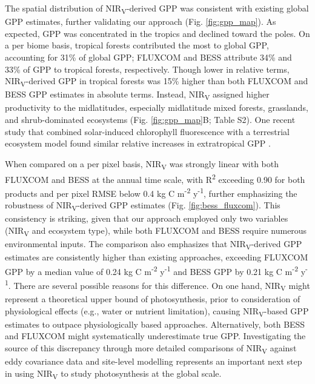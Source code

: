 \documentclass[10pt,letterpaper]{article}
\begin{document}
The spatial distribution of NIR\textsubscript{V}-derived GPP was consistent with existing global GPP estimates, further validating our approach  (Fig. \ref{fig:gpp_map}). As expected, GPP was concentrated in the tropics and declined toward the poles. On a per biome basis, tropical forests contributed the most to global GPP, accounting for 31\%  of global GPP; FLUXCOM and BESS attribute 34\% and 33\% of GPP to tropical forests, respectively. Though lower in relative terms, NIR\textsubscript{V}-derived GPP in tropical forests was 15\% higher than both FLUXCOM and BESS GPP estimates in absolute terms.  Instead, NIR\textsubscript{V} assigned higher productivity to the midlatitudes, especially  midlatitude mixed forests, grasslands, and shrub-dominated ecosystems (Fig. \ref{fig:gpp_map}B; Table S2). One recent study that combined solar-induced chlorophyll fluorescence with a terrestrial ecosystem model found similar relative increases in extratropical GPP \cite{Norton2018}.

When compared on a per pixel basis, NIR\textsubscript{V} was strongly linear with both FLUXCOM and BESS at the annual time scale, with R\textsuperscript{2} exceeding 0.90 for both products and per pixel RMSE below 0.4 kg C m\textsuperscript{-2} y\textsuperscript{-1}, further emphasizing the robustness of NIR\textsubscript{V}-derived GPP estimates (Fig. \ref{fig:bess_fluxcom}). This consistency is striking, given that our approach employed only two variables (NIR\textsubscript{V} and ecosystem type), while both FLUXCOM and BESS require numerous environmental inputs. The comparison also emphasizes that NIR\textsubscript{V}-derived GPP estimates are consistently higher than existing approaches, exceeding FLUXCOM GPP by a median value of 0.24 kg C m\textsuperscript{-2} y\textsuperscript{-1} and BESS GPP by 0.21 kg C m\textsuperscript{-2} y\textsuperscript{-1}. There are several possible reasons for this difference. On one hand, NIR\textsubscript{V} might represent a theoretical upper bound of photosynthesis, prior to consideration of physiological effects (e.g.,  water or nutrient limitation), causing NIR\textsubscript{V}-based GPP estimates to outpace physiologically based approaches. Alternatively, both BESS and FLUXCOM might systematically underestimate true GPP. Investigating the source of this discrepancy through more detailed comparisons of NIR\textsubscript{V} against eddy covariance data and site-level modelling represents an important next step in using NIR\textsubscript{V} to study photosynthesis at the global scale.
\end{document}

